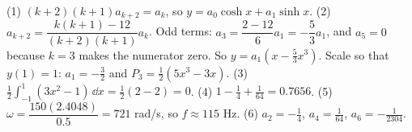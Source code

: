 \begin{answerbox}
(1) $(k+2)(k+1)a_{k+2} = a_k$, so $y = a_0\cosh x + a_1\sinh x$. \quad (2) $a_{k+2} = \dfrac{k(k+1)-12}{(k+2)(k+1)}a_k$. Odd terms: $a_3 = \dfrac{2-12}{6}a_1 = -\dfrac53a_1$, and $a_5=0$ because $k=3$ makes the numerator zero. So $y = a_1(x - \tfrac53x^3)$. Scale so that $y(1)=1$: $a_1=-\tfrac32$ and $P_3 = \tfrac12(5x^3-3x)$. \quad (3) $\tfrac12\displaystyle\int_{-1}^1(3x^2-1)\,\dd x = \tfrac12(2-2) = 0$. \quad (4) $1 - \tfrac14 + \tfrac1{64} = 0.7656$. \quad (5) $\omega = \dfrac{150(2.4048)}{0.5} = 721$ rad/s, so $f\approx115$ Hz. \quad (6) $a_2 = -\tfrac14$, $a_4 = \tfrac1{64}$, $a_6 = -\tfrac1{2304}$.
\end{answerbox}
